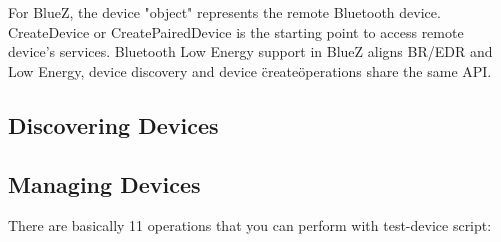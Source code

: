 \documentclass[11pt]{article}
\begin{document}
For BlueZ, the device "object" represents the remote Bluetooth device.
CreateDevice or CreatePairedDevice is the starting point to access
remote device's services. Bluetooth Low Energy support in BlueZ aligns
BR/EDR and Low Energy, device discovery and device \"create\" operations
share the same API.

\subsection{Discovering Devices}

\subsection{Managing Devices}

There are basically 11 operations that you can perform with test-device script:
\end{document}
